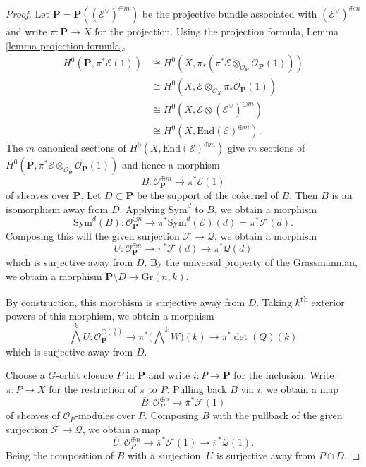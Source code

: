 \begin{proof}
Let $\mathbf{P} = \mathbf{P}((\mathcal{E}^\vee)^{\oplus m})$ be the projective
bundle associated with $(\mathcal{E}^\vee)^{\oplus m}$ and write
$\pi : \mathbf{P} \to X$ for the projection.
Using the projection formula, Lemma \ref{lemma-projection-formula},
\begin{align*}
H^0(\mathbf{P}, \pi^*\mathcal{E}(1))
  & \cong
H^0(X, \pi_*(\pi^*\mathcal{E} \otimes_{\mathcal{O}_{\mathbf{P}}}
  \mathcal{O}_{\mathbf{P}}(1))) \\
  & \cong
H^0(X,\mathcal{E} \otimes_{\mathcal{O}_X} \pi_*\mathcal{O}_{\mathbf{P}}(1)) \\
  & \cong
H^0(X,\mathcal{E} \otimes (\mathcal{E}^\vee)^{\oplus m}) \\
  & \cong
H^0(X,\mathrm{End}(\mathcal{E})^{\oplus m}).
\end{align*}
The $m$ canonical sections of $H^0(X,\mathrm{End}(\mathcal{E})^{\oplus m})$
give $m$ sections of
$H^0(\mathbf{P}, \pi^*\mathcal{E}
  \otimes_{\mathcal{O}_{\mathbf{P}}} \mathcal{O}_{\mathbf{P}}(1))$ and hence
a morphism
$$
  B : \mathcal{O}_{\mathbf{P}}^{\oplus m} \to \pi^*\mathcal{E}(1)
$$
of sheaves over $\mathbf{P}$.
Let $D \subset \mathbf{P}$ be the support of the cokernel of $B$.
Then $B$ is an isomorphism away from $D$.
Applying $\mathrm{Sym}^d$ to $B$, we obtain a morphism
$$
  \mathrm{Sym}^d(B) : \mathcal{O}_{\mathbf{P}}^{\oplus n} \to
    \pi^*\mathrm{Sym}^d(\mathcal{E})(d) = \pi^*\mathcal{F}(d).
$$
Composing this will the given surjection $\mathcal{F} \to \mathcal{Q}$, we
obtain a morphism
$$
  U : \mathcal{O}_{\mathbf{P}}^{\oplus n} \to
        \pi^*\mathcal{F}(d) \to
        \pi^*\mathcal{Q}(d)
$$
which is surjective away from $D$.
By the universal property of the Grassmannian, we obtain a morphism
$\mathbf{P} \setminus D \to \mathrm{Gr}(n,k)$.

By construction, this morphism is surjective away from $D$.
Taking $k$\textsuperscript{th} exterior powers of this morphism, we obtain a
morphism
$$
  \bigwedge^k U : \mathcal{O}_{\mathbf{P}}^{\oplus \binom{n}{k}} \to
    \pi^*\big(\bigwedge\nolimits^k W\big)(k) \to
    \pi^*\det(Q)(k)
$$
which is surjective away from $D$.

Choose a $G$-orbit closure $P$ in $\mathbf{P}$ and write $i : P \to \mathbf{P}$
for the inclusion.
Write $\overline{\pi} : P \to X$ for the restriction of $\pi$ to $P$.
Pulling back $B$ via $i$, we obtain a map
$$
  \overline{B} : \mathcal{O}_P^{\oplus n} \to \overline{\pi}^* \mathcal{F}(1)
$$
of sheaves of $\mathcal{O}_P$-modules over $P$.
Composing $\overline{B}$ with the pullback of the given surjection
$\mathcal{F} \to \mathcal{Q}$, we obtain a map
$$
  \overline{U} : \mathcal{O}_P^{\oplus n} \to
                  \overline{\pi}^*\mathcal{F}(1) \to
                  \overline{\pi}^*\mathcal{Q}(1).
$$
Being the composition of $\overline{B}$ with a surjection, $\overline{U}$ is
surjective away from $P \cap D$.
\end{proof}

